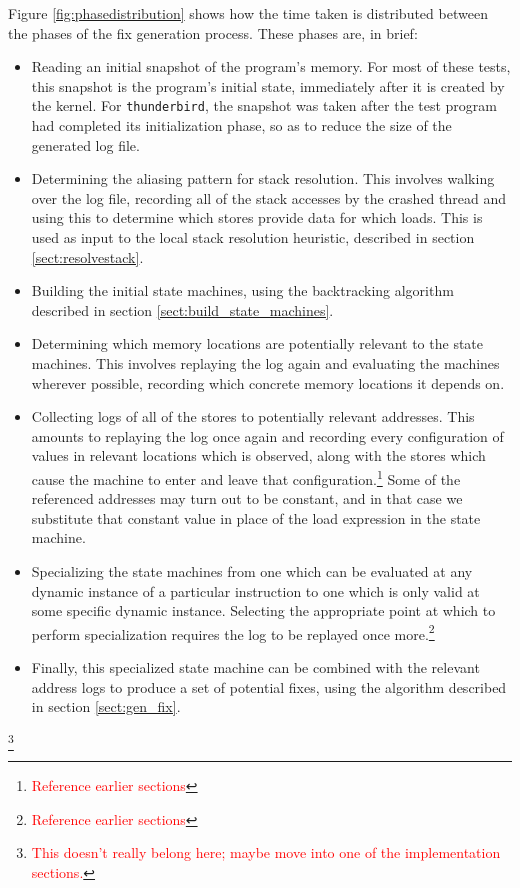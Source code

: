 \documentclass[10pt,twocolumn,preprint,natbib,authoryear]{sigplanconf}
\newcommand{\editorial}[1]{\textcolor{red}{\footnote{\textcolor{red}{#1}}}}
\begin{document}
Figure \ref{fig:phasedistribution} shows how the time taken is
distributed between the phases of the fix generation process.  These
phases are, in brief:

\begin{itemize}
\item Reading an initial snapshot of the program's memory.  For most
  of these tests, this snapshot is the program's initial state,
  immediately after it is created by the kernel.  For
  \verb|thunderbird|, the snapshot was taken after the test program
  had completed its initialization phase, so as to reduce the size of
  the generated log file.
\item Determining the aliasing pattern for stack resolution.  This
  involves walking over the log file, recording all of the stack
  accesses by the crashed thread and using this to determine which
  stores provide data for which loads.  This is used as input to the
  local stack resolution heuristic, described in section
  \ref{sect:resolvestack}.
\item Building the initial state machines, using the backtracking
  algorithm described in section \ref{sect:build_state_machines}.
\item Determining which memory locations are potentially relevant to
  the state machines.  This involves replaying the log again and
  evaluating the machines wherever possible, recording which concrete
  memory locations it depends on.
\item Collecting logs of all of the stores to potentially relevant
  addresses.  This amounts to replaying the log once again and
  recording every configuration of values in relevant locations which
  is observed, along with the stores which cause the machine to enter
  and leave that configuration.\editorial{Reference earlier sections}
  Some of the referenced addresses may turn out to be constant, and in
  that case we substitute that constant value in place of the load
  expression in the state machine.
\item Specializing the state machines from one which can be evaluated
  at any dynamic instance of a particular instruction to one which is
  only valid at some specific dynamic instance.  Selecting the
  appropriate point at which to perform specialization requires the
  log to be replayed once more.\editorial{Reference earlier sections}
\item Finally, this specialized state machine can be combined with the
  relevant address logs to produce a set of potential fixes, using the
  algorithm described in section \ref{sect:gen_fix}.
\end{itemize}\editorial{This doesn't really belong here; maybe move into one of the implementation sections.}
\end{document}
